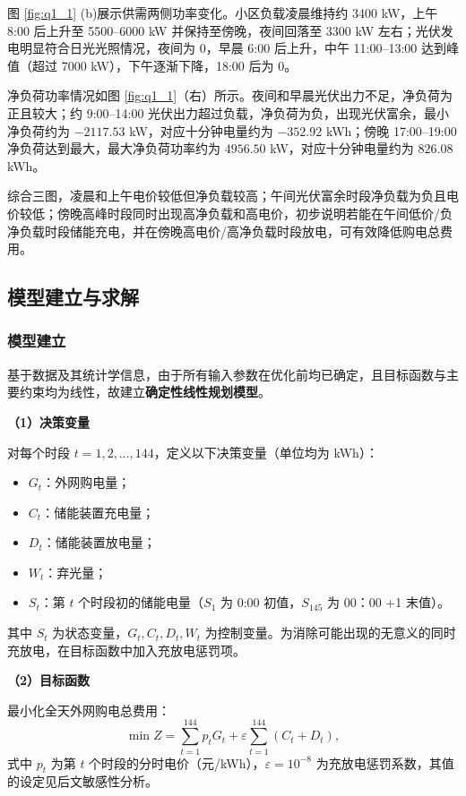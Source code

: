 \documentclass[withoutpreface,bwprint]{cumcmthesis} %
\begin{document}
图 \ref{fig:q1_1} (b)展示供需两侧功率变化。小区负载凌晨维持约 3400 kW，上午 8:00 后上升至 5500--6000 kW 并保持至傍晚，夜间回落至 3300 kW 左右；光伏发电明显符合日光光照情况，夜间为 0，早晨 6:00 后上升，中午 11:00--13:00 达到峰值（超过 7000 kW），下午逐渐下降，18:00 后为 0。

净负荷功率情况如图 \ref{fig:q1_1}（右）所示。夜间和早晨光伏出力不足，净负荷为正且较大；约 9:00--14:00 光伏出力超过负载，净负荷为负，出现光伏富余，最小净负荷约为 $-2117.53$ kW，对应十分钟电量约为 $-352.92$ kWh；傍晚 17:00--19:00 净负荷达到最大，最大净负荷功率约为 $4956.50$ kW，对应十分钟电量约为 $826.08$ kWh。

综合三图，凌晨和上午电价较低但净负载较高；午间光伏富余时段净负载为负且电价较低；傍晚高峰时段同时出现高净负载和高电价，初步说明若能在午间低价/负净负载时段储能充电，并在傍晚高电价/高净负载时段放电，可有效降低购电总费用。

\subsection{模型建立与求解}

\subsubsection{模型建立}

基于数据及其统计学信息，由于所有输入参数在优化前均已确定，且目标函数与主要约束均为线性，故建立\textbf{确定性线性规划模型}。

\textbf{（1）决策变量}

对每个时段 $t=1,2,\ldots,144$，定义以下决策变量（单位均为 kWh）：
\begin{itemize}
  \item $G_t$：外网购电量；
  \item $C_t$：储能装置充电量；
  \item $D_t$：储能装置放电量；
  \item $W_t$：弃光量；
  \item $S_t$：第 $t$ 个时段初的储能电量（$S_1$ 为 0:00 初值，$S_{145}$ 为 00：00 +1 末值）。
\end{itemize}

其中 $S_t$ 为状态变量，$G_t,C_t,D_t,W_t$ 为控制变量。为消除可能出现的无意义的同时充放电，在目标函数中加入充放电惩罚项。

\textbf{（2）目标函数}

最小化全天外网购电总费用：
\begin{equation}
\min Z=\sum_{t=1}^{144}p_tG_t+\varepsilon\sum_{t=1}^{144}(C_t+D_t),
\label{eq:q1-objective}
\end{equation}
式中 $p_t$ 为第 $t$ 个时段的分时电价（元/kWh），$\varepsilon=10^{-8}$ 为充放电惩罚系数，其值的设定见后文敏感性分析。
\end{document}
